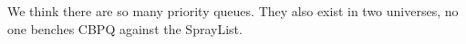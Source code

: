 We think there are so many priority queues. They also exist in two universes, no one benches CBPQ against the SprayList.